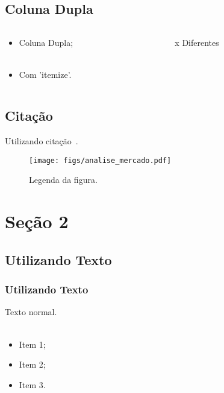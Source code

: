 \documentclass{beamer}
\begin{document}
\subsection{Coluna Dupla}
\begin{frame}
\begin{columns}
\begin{column}{5cm}
\begin{itemize}
\item \justify Coluna Dupla;
\\~\\
\end{itemize}
\begin{itemize}
\item \justify Com 'itemize'.
\end{itemize}
\end{column}
\begin{column}{6cm}
\begin{block}{}
\center \textbf{\color{darkgreen}{Bloco de Cores}} x \alert{Diferentes}
\end{block}
\end{column}
\end{columns}
\end{frame}

\subsection{Citação}
\begin{frame}
\centering Utilizando citação~\cite{agrawal93}.
\begin{figure}[h]
\centering
\texttt{[image: figs/analise\_mercado.pdf]}
\caption{Legenda da figura.}
\label{f.analise_mercado}
\end{figure}
\end{frame}

\section{Seção 2}
\subsection{Utilizando Texto}
\begin{frame}\frametitle{Utilizando Texto}
\justify Texto normal.
\\~\\
\begin{itemize}
\item Item 1;
\item Item 2;
\item Item 3.	
\end{itemize}
\end{frame}
\end{document}

